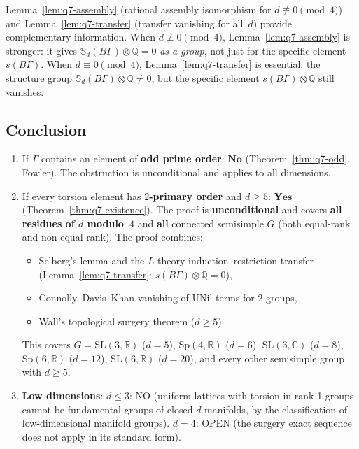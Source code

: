 \begin{remark}
Lemma~\ref{lem:q7-assembly} (rational assembly isomorphism for
$d\not\equiv 0\pmod{4}$) and Lemma~\ref{lem:q7-transfer}
(transfer vanishing for all~$d$) provide complementary information.
When $d\not\equiv 0\pmod{4}$, Lemma~\ref{lem:q7-assembly} is stronger:
it gives $\mathbb S_d(B\Gamma)\otimes\mathbb Q=0$ \emph{as a group},
not just for the specific element $s(B\Gamma)$.
When $d\equiv 0\pmod{4}$, Lemma~\ref{lem:q7-transfer} is essential:
the structure group $\mathbb S_d(B\Gamma)\otimes\mathbb Q\ne 0$,
but the specific element $s(B\Gamma)\otimes\mathbb Q$ still vanishes.
\end{remark}


\subsection*{Conclusion}

\begin{enumerate}
\item If $\Gamma$ contains an element of \textbf{odd prime order}:
  $\boxed{\textbf{No}}$ (Theorem~\ref{thm:q7-odd}, Fowler).
  The obstruction is unconditional and applies to all dimensions.

\item If every torsion element has \textbf{$2$-primary order}
  and $d\ge 5$:
  $\boxed{\textbf{Yes}}$ (Theorem~\ref{thm:q7-existence}).
  The proof is \textbf{unconditional} and covers
  \textbf{all residues of $d$ modulo~$4$} and
  \textbf{all} connected semisimple $G$
  (both equal-rank and non-equal-rank).
  The proof combines:
  \begin{itemize}
  \item Selberg's lemma and the $L$-theory induction--restriction transfer
    (Lemma~\ref{lem:q7-transfer}: $s(B\Gamma)\otimes\mathbb Q=0$),
  \item Connolly--Davis--Khan vanishing of UNil terms for $2$-groups,
  \item Wall's topological surgery theorem ($d\ge 5$).
  \end{itemize}
  This covers $G=\mathrm{SL}(3,\mathbb R)$ ($d=5$),
  $\mathrm{Sp}(4,\mathbb R)$ ($d=6$),
  $\mathrm{SL}(3,\mathbb C)$ ($d=8$),
  $\mathrm{Sp}(6,\mathbb R)$ ($d=12$),
  $\mathrm{SL}(6,\mathbb R)$ ($d=20$),
  and every other semisimple group with $d\ge 5$.

\item \textbf{Low dimensions}: $d\le3$: NO (uniform lattices with torsion
  in rank-1 groups cannot be fundamental groups of closed $d$-manifolds,
  by the classification of low-dimensional manifold groups).
  $d=4$: OPEN (the surgery exact sequence does not apply in its standard form).
\end{enumerate}

